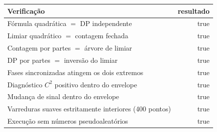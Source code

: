 \begin{tabularx}{\linewidth}{@{}Xr@{}}
\toprule
Verificação & resultado \\
\midrule
Fórmula quadrática $=$ DP independente & true \\
Limiar quadrático $=$ contagem fechada & true \\
Contagem por partes $=$ árvore de limiar & true \\
DP por partes $=$ inversão do limiar & true \\
Fases sincronizadas atingem os dois extremos & true \\
Diagnóstico $C^2$ positivo dentro do envelope & true \\
Mudança de sinal dentro do envelope & true \\
Varreduras suaves estritamente interiores (400 pontos) & true \\
Execução sem números pseudoaleatórios & true \\
\bottomrule
\end{tabularx}
